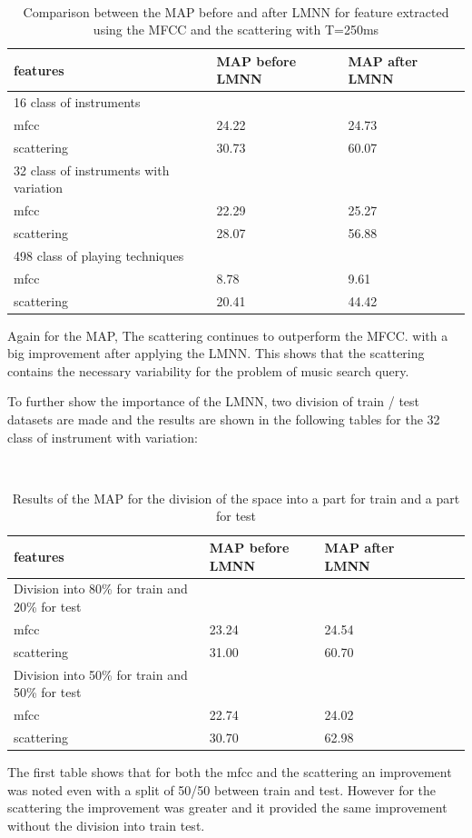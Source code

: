 \documentclass[hidelinks,12pt]{report}
\begin{document}
  \begin{table} [H]
\begin{center} 
\ 
 \setlength{\tabcolsep}{.16667em} 
\begin{tabular}{|l|l|l|} 
\hline
features & MAP before LMNN & MAP after LMNN  \\ 
\hline 
16 class of instruments \\ 
\hline
mfcc         &     24.22& 24.73   \\ 
scattering   &30.73  & 60.07 \\ 

\hline 
32 class of instruments with variation \\ 
\hline
mfcc &22.29 & 25.27  \\ 
scattering &28.07& 56.88  \\ 
\hline 
498 class of playing techniques \\ 
\hline
mfcc &  8.78 & 9.61  \\ 
scattering &20.41& 44.42  \\ 
\hline
\end{tabular} 
\end{center} 
\caption{Comparison between the MAP before and after LMNN for feature extracted using the MFCC and the scattering with T=250ms} 
\label{you} 
\end{table}
Again for the MAP, The scattering continues to outperform the MFCC. with a big improvement after applying the LMNN. This shows that the scattering contains the necessary variability for the problem of music search query.\par
To further show the importance of the LMNN, two division of train / test datasets are made  and the results are shown in the following tables for the 32 class of instrument with variation:
\begin{table} [H]
\begin{center} 
\ 
 \setlength{\tabcolsep}{.16667em} 
\begin{tabular}{ | l | l | l | l | l |l|}
\hline
features & MAP before LMNN & MAP after LMNN  \\ 
\hline 
Division into 80\% for train and 20\% for test \\
\hline
mfcc & 23.24& 24.54  \\ 
scattering &31.00& 60.70    \\ 
\hline
Division into 50\% for train and 50\% for test \\
\hline
mfcc & 22.74& 24.02  \\ 
scattering & 30.70 & 62.98  \\ 
\hline
\end{tabular} 
\end{center} 
\caption{Results of the MAP for the division of the space into a part for train and a part for test} 
\label{you} 
\end{table} 
The first table shows that for both the mfcc and the scattering an improvement was noted even with a split of 50/50 between train and test. However for the scattering  the improvement was greater and it provided the same improvement without the division into train test.
\end{document}
